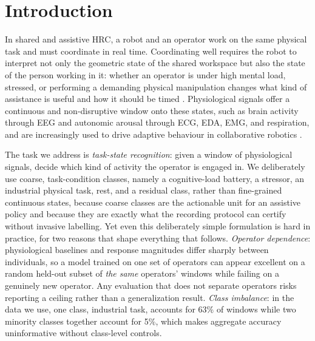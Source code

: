 \documentclass{llncs}
\begin{document}
\section{Introduction}
\label{sec:intro}

In shared and assistive \ac{HRC}, a robot and an operator work on the same physical
task and must coordinate in real time. Coordinating well requires the robot to
interpret not only the geometric state of the shared workspace but also the state of
the person working in it: whether an operator is under high mental load, stressed, or
performing a demanding physical manipulation changes what kind of assistance is useful
and how it should be timed \cite{selvaggio2021autonomy}. Physiological signals offer a
continuous and non-disruptive window onto these states, such as brain activity through
\ac{EEG} and autonomic arousal through \ac{ECG}, \ac{EDA}, \ac{EMG}, and
respiration, and are increasingly used to drive adaptive behaviour in collaborative
robotics \cite{bussolan2024stressdetector,borghi2025operatorstress}.

The task we address is \emph{task-state recognition}: given a window of physiological
signals, decide which kind of activity the operator is engaged in. We deliberately use
coarse, task-condition classes, namely a cognitive-load battery, a stressor, an
industrial physical task, rest, and a residual class, rather than fine-grained
continuous
states, because coarse classes are the actionable unit for an assistive policy and
because they are exactly what the recording protocol can certify without invasive
labelling. Yet even this deliberately simple formulation is hard in practice, for two
reasons that shape everything that follows. \emph{Operator dependence}: physiological
baselines and response magnitudes differ sharply between individuals, so a model
trained on one set of operators can appear excellent on a random held-out subset of
\emph{the same} operators' windows while failing on a genuinely new operator. Any
evaluation that does not separate operators risks reporting a ceiling rather than a
generalization result. \emph{Class imbalance}: in the data we use, one class,
industrial task, accounts for 63\% of windows while two minority classes together
account for 5\%, which makes aggregate accuracy uninformative without class-level
controls.
\end{document}
